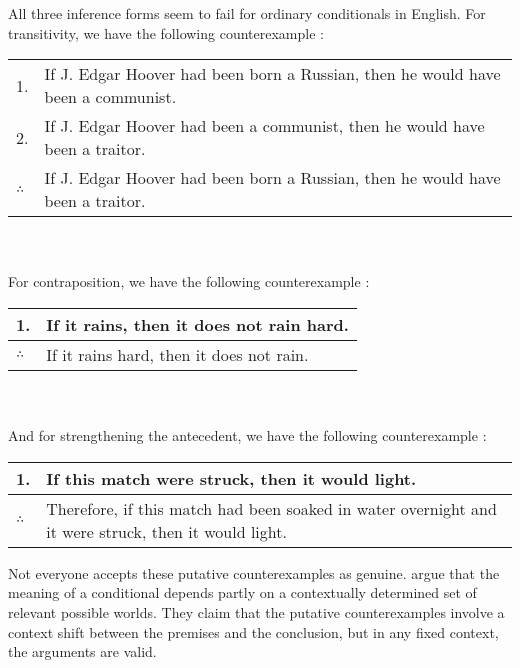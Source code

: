 \medskip

All three inference forms seem to fail for ordinary conditionals in English.  For transitivity, we have the following counterexample \citep[106]{stalnaker:conditionals}:\smallskip\\
\begin{tabular}{p{}p{}}
1. & If J. Edgar Hoover had been born a Russian, then he would have been a communist.\\
2. & If J. Edgar Hoover had been a communist, then he would have been a traitor.\\
\hline
$\therefore$ & If J. Edgar Hoover had been born a Russian, then he would have been a traitor.
\end{tabular}\\\smallskip\\
For contraposition, we have the following counterexample \citep[adapted from][]{adams:tollens}:\smallskip\\
\begin{tabular}{ll}
1. & If it rains, then it does not rain hard.\\
\hline
$\therefore$ & If it rains hard, then it does not rain.
\end{tabular}\\\smallskip\\
And for strengthening the antecedent, we have the following counterexample \citep[106]{stalnaker:conditionals}:\smallskip\\
\begin{tabular}{p{}p{}}
1. & If this match were struck, then it would light.\\
\hline
$\therefore$ & Therefore, if this match had been soaked in water overnight and it were struck, then it would light.
\end{tabular}

\medskip

Not everyone accepts these putative counterexamples as genuine.  \citet{Brogaard2008-BROCAC} argue that the meaning of a conditional depends partly on a contextually determined set of relevant possible worlds.  They claim that the putative counterexamples involve a context shift between the premises and the conclusion, but in any fixed context, the arguments are valid.

